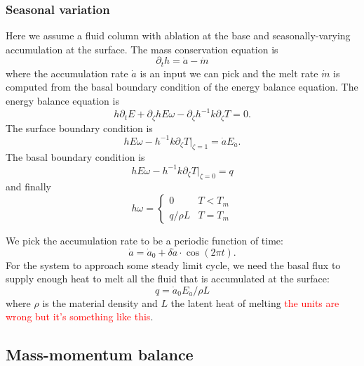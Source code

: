\documentclass{article}
\theoremstyle{definition}
\theoremstyle{plain}
\begin{document}
\subsubsection{Seasonal variation}
Here we assume a fluid column with ablation at the base and seasonally-varying accumulation at the surface.
The mass conservation equation is
\begin{equation}
    \partial_th = \dot a - \dot m
\end{equation}
where the accumulation rate $\dot a$ is an input we can pick and the melt rate $\dot m$ is computed from the basal boundary condition of the energy balance equation.
The energy balance equation is
\begin{equation}
    h\partial_t E + \partial_\zeta hE\omega - \partial_\zeta h^{-1}k\partial_\zeta T = 0.
\end{equation}
The surface boundary condition is
\begin{equation}
    hE\omega - h^{-1}k\partial_\zeta T\Big|_{\zeta = 1} = \dot aE_{\dot a}.
\end{equation}
The basal boundary condition is
\begin{equation}
    hE\omega - h^{-1}k\partial_\zeta T\Big|_{\zeta = 0} = q
\end{equation}
and finally
\begin{equation}
    h\omega = \begin{cases}0 & T < T_m \\ q/\rho L & T = T_m\end{cases}
\end{equation}

We pick the accumulation rate to be a periodic function of time:
\begin{equation}
    \dot a = \dot a_0 + \delta\dot a\cdot\cos(2\pi t).
\end{equation}
For the system to approach some steady limit cycle, we need the basal flux to supply enough heat to melt all the fluid that is accumulated at the surface:
\begin{equation}
    q = \dot a_0 E_{\dot a} / \rho L
\end{equation}
where $\rho$ is the material density and $L$ the latent heat of melting \textcolor{red}{the units are wrong but it's something like this}.

\subsection{Mass-momentum balance}
\end{document}
